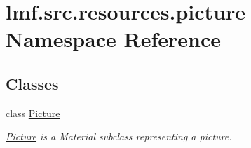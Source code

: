 \hypertarget{namespacelmf_1_1src_1_1resources_1_1picture}{\section{lmf.\+src.\+resources.\+picture Namespace Reference}
\label{namespacelmf_1_1src_1_1resources_1_1picture}
}
\subsection*{Classes}
\begin{DoxyCompactItemize}
\item 
class \hyperlink{classlmf_1_1src_1_1resources_1_1picture_1_1_picture}{Picture}
\begin{DoxyCompactList}\small\item\em \hyperlink{classlmf_1_1src_1_1resources_1_1picture_1_1_picture}{Picture} is a Material subclass representing a picture. \end{DoxyCompactList}\end{DoxyCompactItemize}
